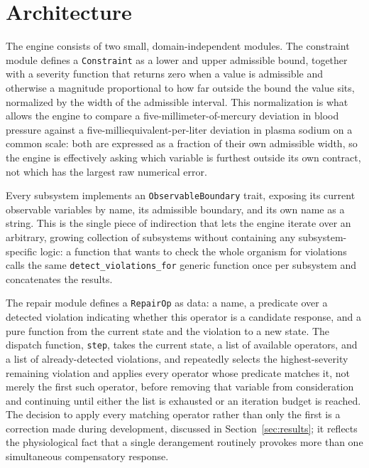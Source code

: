 \documentclass[11pt]{article}
\begin{document}
\section{Architecture}
\label{sec:architecture}

The engine consists of two small, domain-independent modules. The constraint module defines a \texttt{Constraint} as a lower and upper admissible bound, together with a severity function that returns zero when a value is admissible and otherwise a magnitude proportional to how far outside the bound the value sits, normalized by the width of the admissible interval. This normalization is what allows the engine to compare a five-millimeter-of-mercury deviation in blood pressure against a five-milliequivalent-per-liter deviation in plasma sodium on a common scale: both are expressed as a fraction of their own admissible width, so the engine is effectively asking which variable is furthest outside its own contract, not which has the largest raw numerical error.

Every subsystem implements an \texttt{ObservableBoundary} trait, exposing its current observable variables by name, its admissible boundary, and its own name as a string. This is the single piece of indirection that lets the engine iterate over an arbitrary, growing collection of subsystems without containing any subsystem-specific logic: a function that wants to check the whole organism for violations calls the same \texttt{detect\_violations\_for} generic function once per subsystem and concatenates the results.

The repair module defines a \texttt{RepairOp} as data: a name, a predicate over a detected violation indicating whether this operator is a candidate response, and a pure function from the current state and the violation to a new state. The dispatch function, \texttt{step}, takes the current state, a list of available operators, and a list of already-detected violations, and repeatedly selects the highest-severity remaining violation and applies every operator whose predicate matches it, not merely the first such operator, before removing that variable from consideration and continuing until either the list is exhausted or an iteration budget is reached. The decision to apply every matching operator rather than only the first is a correction made during development, discussed in Section~\ref{sec:results}; it reflects the physiological fact that a single derangement routinely provokes more than one simultaneous compensatory response.
\end{document}
